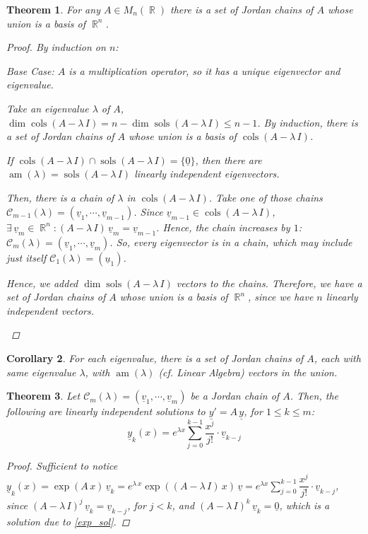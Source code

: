 \documentclass[12pt]{article}
\newcommand{\Exist}[1]{\exists\,{#1}:}
\DeclareMathOperator{\R}{\mathbb{R}}
\newcommand{\tuple}[1]{\underline{#1}}
\newtheorem{theorem}{Theorem}[subsection]
\newtheorem{corollary}[theorem]{Corollary}
\begin{document}
\begin{theorem}
  For any $A\in M_n(\R)$ there is a set of Jordan chains of $A$ whose union is a basis of $\R^n$.
  \begin{proof}
    By induction on $n$:
    \begin{compactitem}
      \item Base Case: $A$ is a multiplication operator, so it has a unique eigenvector and eigenvalue.
      \item Take an eigenvalue $\lambda$ of $A$, $\dim\operatorname{cols}(A-\lambda\,I)=n-\dim\operatorname{sols}(A-\lambda\,I)\leq n-1$. By induction, there is a set of Jordan chains of $A$ whose union is a basis of $\operatorname{cols}(A-\lambda\,I)$. \begin{compactitem}
        \item If $\operatorname{cols}(A-\lambda\,I)\cap\operatorname{sols}(A-\lambda\,I)=\{\tuple{0}\}$, then there are $\operatorname{am}(\lambda)=\operatorname{sols}(A-\lambda\,I)$ linearly independent eigenvectors.
        \item Then, there is a chain of $\lambda$ in $\operatorname{cols}(A-\lambda\,I)$. Take one of those chains $\mathcal{C}_{m-1}(\lambda)=(\tuple{v}_1,\cdots,\tuple{v}_{m-1})$. Since $\tuple{v}_{m-1}\in\operatorname{cols}(A-\lambda\,I)$, $\Exist{\tuple{v}_m\in\R^n}(A-\lambda\,I)\,\tuple{v}_m=\tuple{v}_{m-1}$. Hence, the chain increases by $1$: $\mathcal{C}_m(\lambda)=(\tuple{v}_1,\cdots,\tuple{v}_m)$. So, every eigenvector is in a chain, which may include just itself $\mathcal{C}_1(\lambda)=(\tuple{u}_1)$. 
      \end{compactitem}
      Hence, we added $\dim\operatorname{sols}(A-\lambda\,I)$ vectors to the chains. Therefore, we have a set of Jordan chains of $A$ whose union is a basis of $\R^n$, since we have $n$ linearly independent vectors.
    \end{compactitem}
  \end{proof}
\end{theorem}

\begin{corollary}
  For each eigenvalue, there is a set of Jordan chains of $A$, each with same eigenvalue $\lambda$, with $\operatorname{am}(\lambda)$ (cf. Linear Algebra) vectors in the union.
\end{corollary}

\begin{theorem}
  Let $\mathcal{C}_m(\lambda)=(\tuple{v}_1,\cdots,\tuple{v}_m)$ be a Jordan chain of $A$. Then, the following are linearly independent solutions to $\tuple{y}'=A\,\tuple{y}$, for $1\leq k\leq m$: $$\tuple{y}_k(x)=e^{\lambda x}\sum_{j=0}^{k-1}\frac{x^j}{j!}\cdot\tuple{v}_{k-j}$$
  \begin{proof}
    Sufficient to notice $\tuple{y}_k(x)=\exp(A\,x)\,\tuple{v}_k=e^{\lambda\,x}\exp((A-\lambda\,I)\,x)\,\tuple{v}=e^{\lambda x}\sum_{j=0}^{k-1}\dfrac{x^j}{j!}\cdot\tuple{v}_{k-j}$, since $(A-\lambda\,I)^j\,\tuple{v}_k=\tuple{v}_{k-j}$, for $j<k$, and $(A-\lambda\,I)^k\,\tuple{v}_k=\tuple{0}$, which is a solution due to \ref{exp_sol}.
  \end{proof}
\end{theorem}
\end{document}
